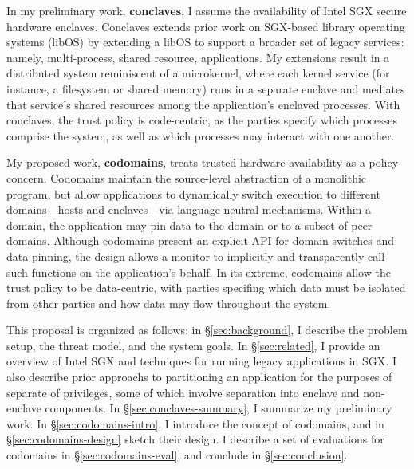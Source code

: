 %
In my preliminary work, \textbf{conclaves}, I assume the availability of Intel
SGX secure hardware enclaves.
%
Conclaves extends prior work on SGX-based library operating systems (libOS) by
extending a libOS to support a broader set of legacy services: namely,
multi-process, shared resource, applications.
%
My extensions result in a distributed system reminiscent of a microkernel,
where each kernel service (for instance, a filesystem or shared memory)
runs in a separate enclave and mediates that service’s shared resources
among the application's enclaved processes.
%
With conclaves, the trust policy is code-centric, as the parties specify which
processes comprise the system, as well as which processes may interact with one
another.


My proposed work, \textbf{codomains}, treats trusted hardware availability as a
policy concern.
%
Codomains maintain the source-level abstraction of a monolithic program, but
allow applications to dynamically switch execution to different domains---hosts
and enclaves---via language-neutral mechanisms.
%
Within a domain, the application may pin data to the domain or to a subset of
peer domains.
%
Although codomains present an explicit API for domain switches and data
pinning, the design allows a monitor to implicitly and transparently call such
functions on the application's behalf.
%
In its extreme, codomains allow the trust policy to be data-centric, with parties
specifing which data must be isolated from other parties and how data may flow
throughout the system.


This proposal is organized as follows: in \S\ref{sec:background}, I describe
the problem setup, the threat model, and the system goals.
%
In \S\ref{sec:related}, I provide an overview of Intel SGX  and techniques for
running legacy applications in SGX\@.
%
I also describe prior approachs to partitioning an application for the
purposes of separate of privileges, some of which involve separation
into enclave and non-enclave components.
In \S\ref{sec:conclaves-summary}, I summarize my preliminary work.
%
In \S\ref{sec:codomains-intro}, I introduce the concept of codomains, and in
\S\ref{sec:codomains-design} sketch their design.
%
I describe a set of evaluations for codomains in \S\ref{sec:codomains-eval},
and conclude in \S\ref{sec:conclusion}.



